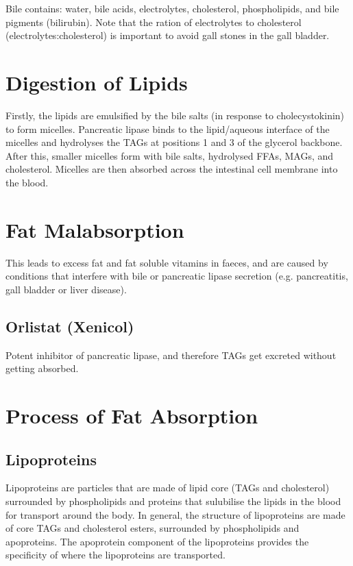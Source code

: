 \documentclass[a4paper, 12pt]{report}
\begin{document}
Bile contains: water, bile acids, electrolytes, cholesterol, phospholipids, and bile pigments (bilirubin).
Note that the ration of electrolytes to cholesterol (electrolytes:cholesterol) is important to avoid gall stones in the gall bladder.

\section{Digestion of Lipids}

Firstly, the lipids are emulsified by the bile salts (in response to cholecystokinin) to form micelles.
Pancreatic lipase binds to the lipid/aqueous interface of the micelles and hydrolyses the TAGs at positions 1 and 3 of the glycerol backbone.
After this, smaller micelles form with bile salts, hydrolysed FFAs, MAGs, and cholesterol.
Micelles are then absorbed across the intestinal cell membrane into the blood.

\section{Fat Malabsorption}

This leads to excess fat and fat soluble vitamins in faeces, and are caused by conditions that interfere with bile or pancreatic lipase secretion (e.g. pancreatitis, gall bladder or liver disease).

\subsection{Orlistat (Xenicol)}

Potent inhibitor of pancreatic lipase, and therefore TAGs get excreted without getting absorbed.

\section{Process of Fat Absorption}

\subsection{Lipoproteins}

Lipoproteins are particles that are made of lipid core (TAGs and cholesterol) surrounded by phospholipids and proteins that sulubilise the lipids in the blood for transport around the body.
In general, the structure of lipoproteins are made of core TAGs and cholesterol esters, surrounded by phospholipids and apoproteins.
The apoprotein component of the lipoproteins provides the specificity of where the lipoproteins are transported.
\end{document}
